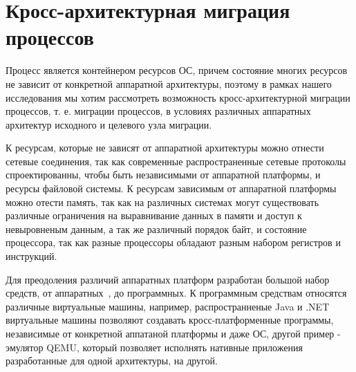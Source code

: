 \section{Кросс-архитектурная миграция процессов}

Процесс является контейнером ресурсов ОС, причем состояние многих ресурсов не зависит от конкретной аппаратной архитектуры, поэтому в рамках нашего исследования мы хотим рассмотреть возможность кросс-архитектурной миграции процессов, т. е. миграции процессов, в условиях различных аппаратных архитектур исходного и целевого узла миграции.

К ресурсам, которые не зависят от аппаратной архитектуры можно отнести сетевые соединения, так как современные распространенные сетевые протоколы спроектированны, чтобы быть независимыми от аппаратной платформы, и ресурсы файловой системы. К ресурсам зависимым от аппаратной платформы можно отести память, так как на различных системах могут существовать различные ограничения на выравнивание данных в памяти и доступ к невыровненым данным, а так же различный порядок байт, и состояние процессора, так как разные процессоры обладают разным набором регистров и инструкций.

Для преодоления различий аппаратных платформ разработан большой набор средств, от аппаратных~\cite{X86ARMBHI,ISAVIRT}, до программных. К программным средствам относятся различные виртуальные машины, например, распространненые Java и .NET виртуальные машины позволяют создавать кросс-платформенные программы, независимые от конкретной аппатаной платформы и даже ОС, другой пример - эмулятор QEMU, который позволяет исполнять нативные приложения разработанные для одной архитектуры, на другой.
